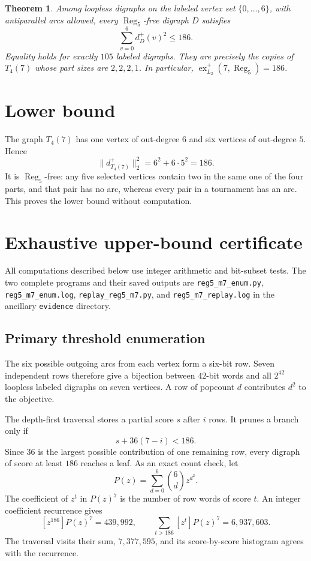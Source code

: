 \documentclass[11pt]{article}
\newtheorem{theorem}{Theorem}
\newcommand{\Reg}{\operatorname{Reg}_5}
\newcommand{\exout}{\operatorname{ex}^{+}_{L_2}}
\begin{document}
\begin{theorem}\label{thm:main}
Among loopless digraphs on the labeled vertex set $\{0,\ldots,6\}$, with
antiparallel arcs allowed, every $\Reg$-free digraph $D$ satisfies
\[
  \sum_{v=0}^6 d_D^+(v)^2\leq 186.
\]
Equality holds for exactly $105$ labeled digraphs.  They are precisely the
copies of $T_4(7)$ whose part sizes are $2,2,2,1$.  In particular,
$\exout(7,\Reg)=186$.
\end{theorem}

\section{Lower bound}

The graph $T_4(7)$ has one vertex of out-degree $6$ and six vertices of
out-degree $5$.  Hence
\[
 \lVert d^+_{T_4(7)}\rVert_2^2=6^2+6\cdot5^2=186.
\]
It is $\Reg$-free: any five selected vertices contain two in the same one of
the four parts, and that pair has no arc, whereas every pair in a tournament
has an arc.  This proves the lower bound without computation.

\section{Exhaustive upper-bound certificate}

All computations described below use integer arithmetic and bit-subset tests.
The two complete programs and their saved outputs are
\texttt{reg5\_m7\_enum.py}, \texttt{reg5\_m7\_enum.log},
\texttt{replay\_reg5\_m7.py}, and \texttt{reg5\_m7\_replay.log} in the
ancillary \texttt{evidence} directory.

\subsection{Primary threshold enumeration}

The six possible outgoing arcs from each vertex form a six-bit row.  Seven
independent rows therefore give a bijection between $42$-bit words and all
$2^{42}$ loopless labeled digraphs on seven vertices.  A row of popcount $d$
contributes $d^2$ to the objective.

The depth-first traversal stores a partial score $s$ after $i$ rows.  It prunes
a branch only if
\[
 s+36(7-i)<186.\tag{1}\label{eq:prune}
\]
Since $36$ is the largest possible contribution of one remaining row, every
digraph of score at least $186$ reaches a leaf.  As an exact count check, let
\[
 P(z)=\sum_{d=0}^{6}\binom{6}{d}z^{d^2}.
\]
The coefficient of $z^t$ in $P(z)^7$ is the number of row words of score $t$.
An integer coefficient recurrence gives
\[
 [z^{186}]P(z)^7=439{,}992,
 \qquad \sum_{t>186}[z^t]P(z)^7=6{,}937{,}603.
\]
The traversal visits their sum, $7{,}377{,}595$, and its score-by-score
histogram agrees with the recurrence.
\end{document}

